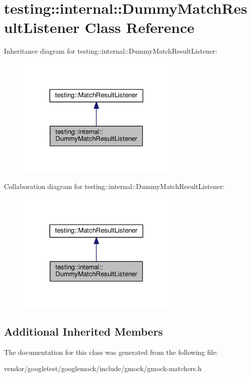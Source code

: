 \hypertarget{classtesting_1_1internal_1_1DummyMatchResultListener}{}\section{testing\+:\+:internal\+:\+:Dummy\+Match\+Result\+Listener Class Reference}
\label{classtesting_1_1internal_1_1DummyMatchResultListener}


Inheritance diagram for testing\+:\+:internal\+:\+:Dummy\+Match\+Result\+Listener\+:\nopagebreak
\begin{figure}[H]
\begin{center}
\leavevmode
\includegraphics[width=222pt]{classtesting_1_1internal_1_1DummyMatchResultListener__inherit__graph}
\end{center}
\end{figure}


Collaboration diagram for testing\+:\+:internal\+:\+:Dummy\+Match\+Result\+Listener\+:\nopagebreak
\begin{figure}[H]
\begin{center}
\leavevmode
\includegraphics[width=222pt]{classtesting_1_1internal_1_1DummyMatchResultListener__coll__graph}
\end{center}
\end{figure}
\subsection*{Additional Inherited Members}


The documentation for this class was generated from the following file\+:\begin{DoxyCompactItemize}
\item 
vendor/googletest/googlemock/include/gmock/gmock-\/matchers.\+h\end{DoxyCompactItemize}
